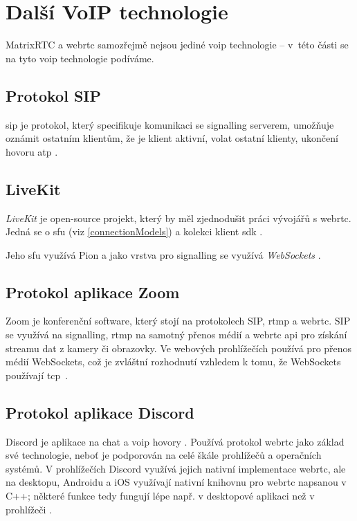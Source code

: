 \section{Další VoIP technologie}\label{voipTech}

MatrixRTC a \gls{webrtc} samozřejmě nejsou jediné \gls{voip} technologie --
v~této části se na tyto \gls{voip} technologie podíváme.

\subsection{Protokol SIP}\label{sip}

\gls{sip} je protokol, který specifikuje komunikaci se signalling serverem,
umožňuje oznámit ostatním klientům, že je klient aktivní, volat ostatní klienty,
ukončení hovoru atp \parencite{ExtraHop-SIPOverview}.

\subsection{LiveKit}

\textit{LiveKit} je open-source projekt, který by měl zjednodušit práci vývojářů
s \gls{webrtc}. Jedná se o \gls{sfu} (viz \ref{connectionModels}) a kolekci
klient \gls{sdk} \parencite{LiveKit-Homepage,GitHub-LiveKit}.

Jeho \gls{sfu} využívá Pion a jako vrstva pro signalling se využívá
\textit{WebSockets} \parencite{GitHub-LiveKit}.

\subsection{Protokol aplikace Zoom}

Zoom je konferenční software, který stojí na protokolech SIP, \gls{rtmp} a
\gls{webrtc}. SIP se využívá na signalling, \gls{rtmp} na samotný přenos médií a
\gls{webrtc} \gls{api} pro získání streamu dat z kamery či obrazovky. Ve
webových prohlížečích používá pro přenos médií WebSockets, což je zvláštní
rozhodnutí vzhledem k tomu, že WebSockets používají
\gls{tcp}~\parencite{WebRTCHacks-HowZoomAvoidWebRTC,EBODigital-HowDoesZoomWork,
    Zoom-Homepage}.

\subsection{Protokol aplikace Discord}

Discord je aplikace na chat a \gls{voip} hovory
\parencite{Discord-WhatIsDiscord}. Používá protokol \gls{webrtc} jako základ své
technologie, neboť je podporován na celé škále prohlížečů a operačních systémů.
V prohlížečích Discord využívá jejich nativní implementace \gls{webrtc}, ale na
desktopu, Androidu a iOS využívají nativní knihovnu pro \gls{webrtc} napsanou v
C++; některé funkce tedy fungují lépe např. v desktopové aplikaci než v
prohlížeči \parencite{Discord-HowDoesItHandleMillionsOfUsers}.

